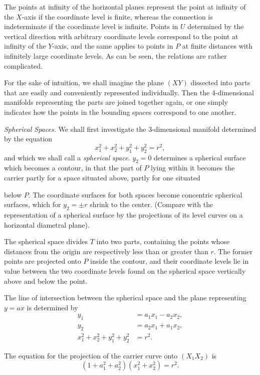 \documentclass{article}
\begin{document}
The points at infinity of the horizontal planes represent the point at infinity of the $X$-axis if the coordinate level is finite, whereas the connection is indeterminate if the coordinate level is infinite. Points in $U$ determined by the vertical direction with arbitrary coordinate levels correspond to the point at infinity of the $Y$-axis, and the same applies to points in $P$ at finite distances with infinitely large coordinate levels. As can be seen, the relations are rather complicated.

For the sake of intuition, we shall imagine the plane $(XY)$ dissected into parts that are easily and conveniently represented individually. Then the 4-dimensional manifolds representing the parts are joined together again, or one simply indicates how the points in the bounding spaces correspond to one another.

\emph{Spherical Spaces.} We shall first investigate the 3-dimensional manifold determined by the equation
\[
x_1^2 + x_2^2 + y_1^2 + y_2^2 = r^2,
\]
and which we shall call a \emph{spherical space}. $y_2 = 0$ determines a spherical surface which becomes a contour, in that the part of $P$ lying within it becomes the carrier partly for a space situated above, partly for one situated

below $P$. The coordinate surfaces for both spaces become concentric spherical surfaces, which for $y_2 = \pm r$ shrink to the center. (Compare with the representation of a spherical surface by the projections of its level curves on a horizontal diametral plane).

The spherical space divides $T$ into two parts, containing the points whose distances from the origin are respectively less than or greater than $r$. The former points are projected onto $P$ inside the contour, and their coordinate levels lie in value between the two coordinate levels found on the spherical space vertically above and below the point.

The line of intersection between the spherical space and the plane representing $y = ax$ is determined by
\[
\begin{aligned}
y_1 &= a_1 x_1 - a_2 x_2, \\
y_2 &= a_2 x_1 + a_1 x_2, \\
x_1^2 + x_2^2 + y_1^2 + y_2^2 &= r^2.
\end{aligned}
\]

The equation for the projection of the carrier curve onto $(X_1 X_2)$ is
\[
(1 + a_1^2 + a_2^2)(x_1^2 + x_2^2) = r^2.
\]
\end{document}
